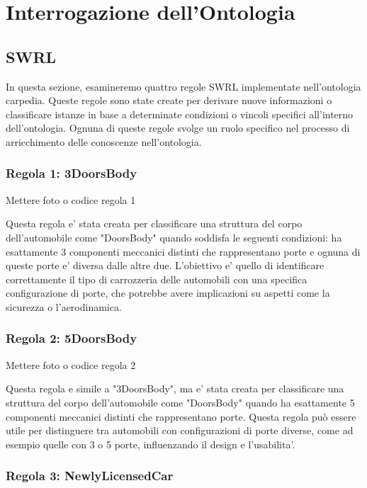\chapter{Interrogazione dell'Ontologia}

\section{SWRL}\label{sec:swrl}
In questa sezione, esamineremo quattro regole SWRL implementate nell'ontologia carpedia.
Queste regole sono state create per derivare nuove informazioni o classificare istanze in base a determinate
condizioni o vincoli specifici all'interno dell'ontologia.
Ognuna di queste regole svolge un ruolo specifico nel processo di arricchimento delle conoscenze nell'ontologia.

\subsection{Regola 1: 3DoorsBody}

Mettere foto o codice regola 1

Questa regola e' stata creata per classificare una struttura del corpo dell'automobile come "DoorsBody" quando
soddisfa le seguenti condizioni: ha esattamente 3 componenti meccanici distinti che rappresentano porte e ognuna
di queste porte e' diversa dalle altre due.
L'obiettivo e' quello di identificare correttamente il tipo di carrozzeria delle automobili con una
specifica configurazione di porte, che potrebbe avere implicazioni su aspetti come la sicurezza o l'aerodinamica.

\subsection{Regola 2: 5DoorsBody}

Mettere foto o codice regola 2

Questa regola e simile a "3DoorsBody", ma e' stata creata per classificare una struttura del corpo dell'automobile
come "DoorsBody" quando ha esattamente 5 componenti meccanici distinti che rappresentano porte.
Questa regola può essere utile per distinguere tra automobili con configurazioni di porte diverse,
come ad esempio quelle con 3 o 5 porte, influenzando il design e l'usabilita'.

\subsection{Regola 3: NewlyLicensedCar}

